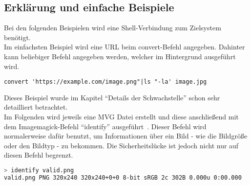 \subsection{Erklärung und einfache Beispiele}\label{subsec:erklaerung-und-einfache-beispiele}

Bei den folgenden Beispielen wird eine Shell-Verbindung zum Zielsystem benötigt.\\

Im einfachsten Beispiel wird eine URL beim convert-Befehl angegeben.
Dahinter kann beliebiger Befehl angegeben werden, welcher im Hintergrund ausgeführt wird.
\begin{lstlisting}[language=Text, caption=convert-Befehl mit URL als einfachstes Beispiel,label={lst:einfachstesbeispiel}]
convert 'https://example.com/image.png"|ls "-la' image.jpg
\end{lstlisting}
\vspace{5mm}

Dieses Beispiel wurde im Kapitel "`Details der Schwachstelle"' schon sehr detailliert betrachtet.\\

Im Folgenden wird jeweils eine MVG Datei erstellt und diese anschließend mit dem Imagemagick-Befehl "`identify"' ausgeführt~\cite{PHPImagickIdentifyImage}.
Dieser Befehl wird normalerweise dafür benutzt,
um Informationen über ein Bild - wie die Bildgröße oder den Bildtyp - zu bekommen.
Die Sicherheitslücke ist jedoch nicht nur auf diesen Befehl begrenzt.\\

\begin{lstlisting}[language=Bash, caption=Erklaerung - Identify einer validen PNG Datei,label={lst:lstlisting}]
> identify valid.png
valid.png PNG 320x240 320x240+0+0 8-bit sRGB 2c 302B 0.000u 0:00.000
\end{lstlisting}

